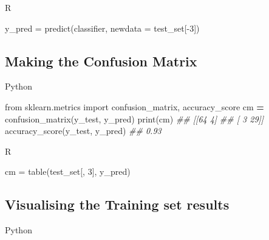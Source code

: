 \documentclass[
]{book}
\newenvironment{Shaded}{\begin{snugshade}}{\end{snugshade}}
\newcommand{\AttributeTok}[1]{\textcolor[rgb]{0.77,0.63,0.00}{#1}}
\newcommand{\BuiltInTok}[1]{#1}
\newcommand{\CommentTok}[1]{\textcolor[rgb]{0.56,0.35,0.01}{\textit{#1}}}
\newcommand{\DecValTok}[1]{\textcolor[rgb]{0.00,0.00,0.81}{#1}}
\newcommand{\FunctionTok}[1]{\textcolor[rgb]{0.00,0.00,0.00}{#1}}
\newcommand{\ImportTok}[1]{#1}
\newcommand{\NormalTok}[1]{#1}
\newcommand{\OperatorTok}[1]{\textcolor[rgb]{0.81,0.36,0.00}{\textbf{#1}}}
\newcommand{\OtherTok}[1]{\textcolor[rgb]{0.56,0.35,0.01}{#1}}
\newcommand{\SpecialCharTok}[1]{\textcolor[rgb]{0.00,0.00,0.00}{#1}}
\theoremstyle{definition}
\theoremstyle{definition}
\theoremstyle{definition}
\theoremstyle{definition}
\theoremstyle{remark}
\begin{document}
R

\begin{Shaded}
\begin{Highlighting}[]
\NormalTok{y\_pred }\OtherTok{=} \FunctionTok{predict}\NormalTok{(classifier, }\AttributeTok{newdata =}\NormalTok{ test\_set[}\SpecialCharTok{{-}}\DecValTok{3}\NormalTok{])}
\end{Highlighting}
\end{Shaded}

\hypertarget{making-the-confusion-matrix-3}{%
\subsection{Making the Confusion Matrix}\label{making-the-confusion-matrix-3}}

Python

\begin{Shaded}
\begin{Highlighting}[]
\ImportTok{from}\NormalTok{ sklearn.metrics }\ImportTok{import}\NormalTok{ confusion\_matrix, accuracy\_score}
\NormalTok{cm }\OperatorTok{=}\NormalTok{ confusion\_matrix(y\_test, y\_pred)}
\BuiltInTok{print}\NormalTok{(cm)}
\CommentTok{\#\# [[64  4]}
\CommentTok{\#\#  [ 3 29]]}
\NormalTok{accuracy\_score(y\_test, y\_pred)}
\CommentTok{\#\# 0.93}
\end{Highlighting}
\end{Shaded}

R

\begin{Shaded}
\begin{Highlighting}[]
\NormalTok{cm }\OtherTok{=} \FunctionTok{table}\NormalTok{(test\_set[, }\DecValTok{3}\NormalTok{], y\_pred)}
\end{Highlighting}
\end{Shaded}

\hypertarget{visualising-the-training-set-results-4}{%
\subsection{Visualising the Training set results}\label{visualising-the-training-set-results-4}}

Python
\end{document}
